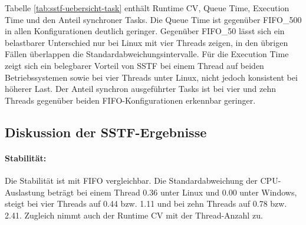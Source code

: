 \begin{sloppypar}
\begin{table}[H]
\caption{Runtime \acs{CV} sowie Queue Time, Execution Time und Anteil synchroner Tasks des \acs{SSTF}-Schedulers für Linux und Windows bei einem, vier und zehn Threads, angegeben als Mittelwerte $\pm$ Standardabweichung aus $n=20$ Läufen}
\label{tab:sstf-uebersicht-task}
\centering
\begingroup
\setlength{\tabcolsep}{4pt}
\endgroup
\end{table}

\noindent Tabelle \ref{tab:sstf-uebersicht-task} enthält Runtime \acs{CV}, Queue Time, Execution Time und den Anteil synchroner Tasks. Die Queue Time ist gegenüber \acs{FIFO}\_500 in allen Konfigurationen deutlich geringer. Gegenüber \acs{FIFO}\_50 lässt sich ein belastbarer Unterschied nur bei Linux mit vier Threads zeigen, in den übrigen Fällen überlappen die Standardabweichungsintervalle. Für die Execution Time zeigt sich ein belegbarer Vorteil von \acs{SSTF} bei einem Thread auf beiden Betriebssystemen sowie bei vier Threads unter Linux, nicht jedoch konsistent bei höherer Last. Der Anteil synchron ausgeführter Tasks ist bei vier und zehn Threads gegenüber beiden \acs{FIFO}-Konfigurationen erkennbar geringer.

\subsection{Diskussion der \acs{SSTF}-Ergebnisse}

\paragraph{Stabilität:}
Die Stabilität ist mit \acs{FIFO} vergleichbar. Die Standardabweichung der \acs{CPU}-Auslastung beträgt bei einem Thread 0.36 unter Linux und 0.00 unter Windows, steigt bei vier Threads auf 0.44 bzw. 1.11 und bei zehn Threads auf 0.78 bzw. 2.41. Zugleich nimmt auch der Runtime \acs{CV} mit der Thread-Anzahl zu.


\end{sloppypar}
